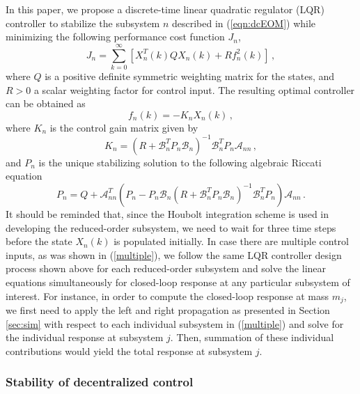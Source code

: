 \documentclass[11pt]{ucthesis}
\newcommand{\beq}{\begin{equation}}
\newcommand{\eeq}{\end{equation}}
\begin{document}
In this paper, we propose a discrete-time linear quadratic regulator (LQR) controller to stabilize the subsystem $n$ described in (\ref{eqn:dcEOM}) while minimizing the following performance cost function $J_n$,
\beq		\label{lqr1}
J_n = \sum_{k=0}^{\infty} \left [ X_{n}^{T} (k) Q X_{n}(k) + R f^{2}_{n} (k) \right ]\,,
\eeq
where $Q$ is a positive definite symmetric weighting matrix for the states, and $R>0$ a scalar weighting factor for control input. The resulting optimal controller can be obtained as
\beq		\label{lqr2}
f_n (k) = - K_n X_n (k) \,,
\eeq
where $K_n$ is the control gain matrix given by
\beq		\label{lqr3}
K_n = (R+\mathcal{B}_n^{T} P_n \mathcal{B}_n)^{-1} \mathcal{B}_n^{T} P_n \mathcal{A}_{nn} \,,
\eeq
and $P_n$ is the unique stabilizing solution to the following algebraic Riccati equation
\[
P_n = Q + \mathcal{A}_{nn}^T(P_n-P_n \mathcal{B}_n (R +\mathcal{B}_n^T P_n \mathcal{B}_n)^{-1} \mathcal{B}_n^T P_n) \mathcal{A}_{nn}\,.
\]
It should be reminded that, since the Houbolt integration scheme is used in developing the reduced-order subsystem, we need to wait for three time steps before the state $X_n (k)$ is populated initially. In case there are multiple control inputs, as was shown in (\ref{multiple}), we follow the same LQR controller design process shown above for each reduced-order subsystem and solve the linear equations simultaneously for closed-loop response at any particular subsystem of interest. For instance, in order to compute the closed-loop response at mass $m_j$, we first need to apply the left and right propagation as presented in Section \ref{sec:sim} with respect to each individual subsystem in (\ref{multiple}) and solve for the individual response at subsystem $j$. Then, summation of these individual contributions would yield the total response at subsystem $j$.

\subsubsection{Stability of decentralized control}
\label{sec:DCproof}
\end{document}
